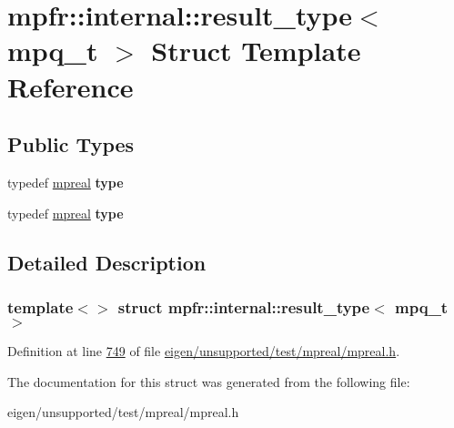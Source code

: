 \hypertarget{structmpfr_1_1internal_1_1result__type_3_01mpq__t_01_4}{}\section{mpfr\+:\+:internal\+:\+:result\+\_\+type$<$ mpq\+\_\+t $>$ Struct Template Reference}
\label{structmpfr_1_1internal_1_1result__type_3_01mpq__t_01_4}
\subsection*{Public Types}
\begin{DoxyCompactItemize}
\item 
\mbox{\label{structmpfr_1_1internal_1_1result__type_3_01mpq__t_01_4_abd0775c680c24f8ffcb22722640edfe9}} 
typedef \hyperlink{classmpfr_1_1mpreal}{mpreal} {\bfseries type}
\item 
\mbox{\label{structmpfr_1_1internal_1_1result__type_3_01mpq__t_01_4_abd0775c680c24f8ffcb22722640edfe9}} 
typedef \hyperlink{classmpfr_1_1mpreal}{mpreal} {\bfseries type}
\end{DoxyCompactItemize}


\subsection{Detailed Description}
\subsubsection*{template$<$$>$\newline
struct mpfr\+::internal\+::result\+\_\+type$<$ mpq\+\_\+t $>$}



Definition at line \hyperlink{eigen_2unsupported_2test_2mpreal_2mpreal_8h_source_l00749}{749} of file \hyperlink{eigen_2unsupported_2test_2mpreal_2mpreal_8h_source}{eigen/unsupported/test/mpreal/mpreal.\+h}.



The documentation for this struct was generated from the following file\+:\begin{DoxyCompactItemize}
\item 
eigen/unsupported/test/mpreal/mpreal.\+h\end{DoxyCompactItemize}

